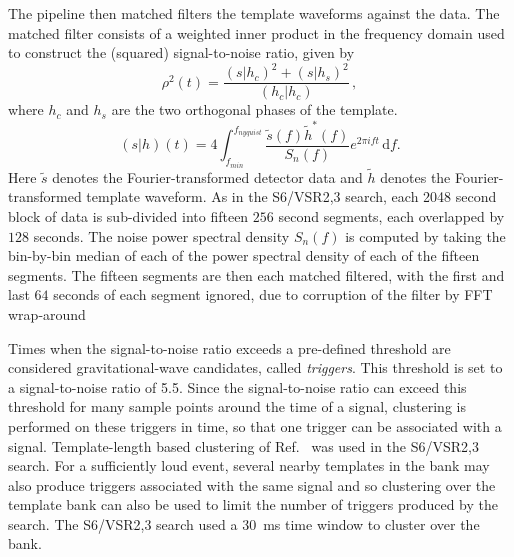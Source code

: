 The pipeline then matched filters the template waveforms against the data.
The matched filter consists of a weighted inner product in the frequency
domain used to construct the (squared) signal-to-noise ratio, given by
%
\begin{equation}
\rho^2(t) = \frac{(s|h_c)^2 + (s|h_s)^2}{(h_c|h_c)} \, ,
\label{eq:snr}
\end{equation}
%
where $h_c$ and $h_s$ are the two orthogonal phases of the template.
%
\begin{equation}
(s|h)(t) = 4\int_{f_{min}}^{f_{nyquist}} \frac{\tilde{s}(f)\tilde{h}^*(f)}{S_n (f)}e^{2\pi i f t}\, \mathrm{d}f.
\label{eq:ip}
\end{equation}
%
Here $\tilde{s}$ denotes the Fourier-transformed detector data and $\tilde{h}$
denotes the Fourier-transformed template waveform. As in the S6/VSR2,3 search,
each 2048 second block of data is sub-divided into fifteen $256$ second
segments, each overlapped by $128$ seconds. The noise power spectral
density $S_n(f)$ is computed by taking the bin-by-bin median of each of the power
spectral density of each of the fifteen segments. The fifteen segments are then each
matched filtered, with the first and last $64$ seconds of each segment
ignored, due to corruption of the filter by FFT
wrap-around~\cite{Allen:2005fk}

Times when the signal-to-noise ratio exceeds a pre-defined threshold are
considered gravitational-wave candidates, called
\emph{triggers}\cite{Allen:2005fk}. This threshold is set to a
signal-to-noise ratio of 5.5.  Since the signal-to-noise ratio can exceed
this threshold for many sample points around the time of a signal, clustering
is performed on these triggers in time, so that one trigger can be associated
with a signal. Template-length based clustering of 
Ref.~\cite{Allen:2005fk} was used in the S6/VSR2,3 search. 
For a sufficiently loud event, several nearby templates in the
bank may also produce triggers associated with the same signal and so
clustering over the template bank can also be used to limit the number of
triggers produced by the search. The S6/VSR2,3 search used a 30~ms time window
to cluster over the bank.

